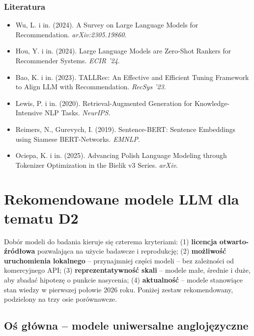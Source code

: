 \documentclass[12pt,a4paper]{article}
\newcommand{\topicsection}[1]{\subsubsection*{#1}}
\newenvironment{literatura}{%
    \topicsection{Literatura}
    \begin{itemize}[leftmargin=1.6em,labelsep=0.5em]
}{%
    \end{itemize}
}
\begin{document}
\begin{literatura}
\item Wu, L. i in. (2024). A Survey on Large Language Models for Recommendation. \textit{arXiv:2305.19860}.
\item Hou, Y. i in. (2024). Large Language Models are Zero-Shot Rankers for Recommender Systems. \textit{ECIR '24}.
\item Bao, K. i in. (2023). TALLRec: An Effective and Efficient Tuning Framework to Align LLM with Recommendation. \textit{RecSys '23}.
\item Lewis, P. i in. (2020). Retrieval-Augmented Generation for Knowledge-Intensive NLP Tasks. \textit{NeurIPS}.
\item Reimers, N., Gurevych, I. (2019). Sentence-BERT: Sentence Embeddings using Siamese BERT-Networks. \textit{EMNLP}.
\item Ociepa, K. i in. (2025). Advancing Polish Language Modeling through Tokenizer Optimization in the Bielik v3 Series. \textit{arXiv}.
\end{literatura}

\newpage

\section{Rekomendowane modele LLM dla tematu D2}
\label{sec:modele}

Dobór modeli do badania kieruje się czterema kryteriami: (1) \textbf{licencja otwarto-źródłowa} pozwalająca na użycie badawcze i reprodukcję; (2) \textbf{możliwość uruchomienia lokalnego} -- przynajmniej części modeli -- bez zależności od komercyjnego API; (3) \textbf{reprezentatywność skali} -- modele małe, średnie i duże, aby zbadać hipotezę o punkcie nasycenia; (4) \textbf{aktualność} -- modele stanowiące stan wiedzy w pierwszej połowie 2026 roku. Poniżej zestaw rekomendowany, podzielony na trzy osie porównawcze.

\subsection*{Oś główna -- modele uniwersalne anglojęzyczne}
\end{document}
